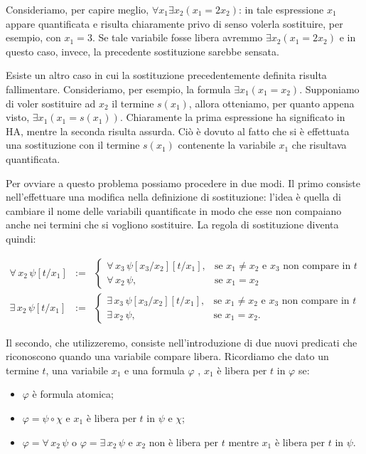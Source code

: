 Consideriamo, per capire meglio, $\forall x_1\exists x_2 (x_1=2x_2)$: in tale espressione $x_1$ appare quantificata e risulta chiaramente privo di senso volerla sostituire, per esempio, con $x_1=3$. Se tale variabile fosse libera avremmo $\exists x_2 (x_1=2x_2)$ e in questo caso, invece, la precedente sostituzione sarebbe sensata.

Esiste un altro caso in cui la sostituzione precedentemente definita risulta fallimentare. Consideriamo, per esempio, la formula $\exists x_1(x_1=x_2)$.
Supponiamo di voler sostituire ad $x_2$ il termine $s(x_1)$, allora otteniamo, per quanto appena visto, $\exists x_1(x_1=s(x_1))$.
Chiaramente la prima espressione ha significato in HA, mentre la seconda risulta assurda.
Ci\`o \`e dovuto al fatto che si \`e effettuata una sostituzione con il termine $s(x_1)$ contenente la variabile $x_1$ che risultava quantificata.

Per ovviare a questo problema possiamo procedere in due modi. Il primo consiste nell'effettuare una modifica nella definizione di sostituzione: l'idea \`e quella di cambiare il nome delle variabili quantificate in modo che esse non compaiano anche nei termini che si vogliono sostituire. La regola di sostituzione diventa quindi:

\begin{eqnarray*}
 \forall\, x_2\, \psi [t/x_1]  &:=&    \left \{ \begin{array}{ll}
\forall\, x_3\, \psi [x_3/x_2] [t/x_1], & \textrm{se $x_1 \ne x_2$ e $x_3$ non compare in $t$}\\
\forall\, x_2\, \psi, & \textrm{se $x_1 = x_2$}
\end{array}\right.\\
\exists\, x_2\, \psi [t/x_1]  &:=& \left \{ \begin{array}{ll}
\exists\, x_3\, \psi [x_3/x_2] [t/x_1], & \textrm{se $x_1 \ne x_2$ e $x_3$ non compare in $t$}\\
\exists\, x_2\, \psi, & \textrm{se $x_1 = x_2$}.
\end{array}\right.
\end{eqnarray*}

Il secondo, che utilizzeremo, consiste nell'introduzione di due nuovi pre\-di\-ca\-ti che riconoscono quando una variabile compare libera. Ricordiamo che dato un termine $t$, una variabile $x_1$ e una formula $\varphi$ , $x_1$ \`e libera per $t$ in $\varphi$ se:
\begin{itemize}
 \item $\varphi$ \`e formula atomica;
\item $\varphi=\psi\circ \chi$ e $x_1$ \`e libera per $t$ in $\psi$ e $\chi$;
\item $\varphi=\forall \,x_2\, \psi$ o $\varphi=\exists \,x_2\, \psi$ e $x_2$ non \`e libera per $t$ mentre $x_1$ \`e libera per $t$ in $\psi$.
\end{itemize}

